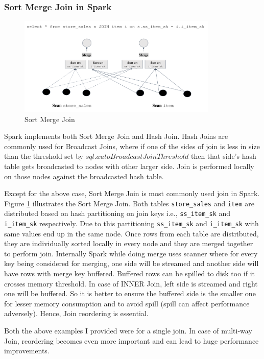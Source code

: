 \subsubsection{Sort Merge Join in Spark}\label{subsubsec:sparkjoin}

\begin{figure}[ht]
    \centerline{\includegraphics[width=9.5cm]{fig/SortMergeJoin.png}}
    \caption{Sort Merge Join}
    \label{sort_merge_join}
\end{figure}

Spark implements both Sort Merge Join and Hash Join.
Hash Joins are commonly used for Broadcast Joins, where if one of the sides of join is less in size than the threshold set by \texttt{$sql.autoBroadcastJoinThreshold$} then that side's hash table gets broadcasted to nodes with other larger side.
Join is performed locally on those nodes against the broadcasted hash table.

Except for the above case, Sort Merge Join is most commonly used join in Spark. Figure \ref{sort_merge_join} illustrates the Sort Merge Join.
Both tables \texttt{store\_sales} and \texttt{item} are distributed based on hash partitioning on join keys i.e., \texttt{ss\_item\_sk} and \texttt{i\_item\_sk} respectively. Due to this partitioning \texttt{ss\_item\_sk}  and \texttt{i\_item\_sk} with same values end up in the same node. Once rows from each table are distributed, they are individually sorted locally in every node and they are merged together to perform join. Internally Spark while doing merge uses scanner where for every key being considered for merging, one side will be streamed and another side will have rows with merge key buffered. Buffered rows can be spilled to disk too if it crosses memory threshold. In case of INNER Join, left side is streamed and right one will be buffered. So it is better to ensure the buffered side is the smaller one for lesser memory consumption and to avoid spill (spill can affect performance adversely). Hence, Join reordering is essential.

Both the above examples I provided were for a single join. In case of multi-way Join, reordering becomes even more important and can lead to huge performance improvements.